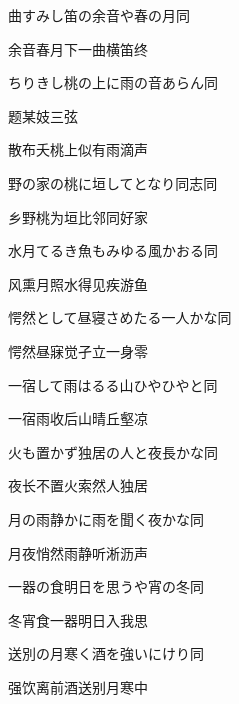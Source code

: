 \begin{haiku}
    {\FH 曲すみし笛の余音や春の月}\hfill{\FH 同}

    {\FK 余音春月下一曲横笛终}
\end{haiku}

\begin{haiku}
    {\FH ちりきし桃の上に雨の音あらん}\hfill{\FH 同}

    {\FK 题某妓三弦}

    {\FK 散布夭桃上似有雨滴声}
\end{haiku}

\begin{haiku}
    {\FH 野の家の桃に垣してとなり同志}\hfill{\FH 同}

    {\FK 乡野桃为垣比邻同好家}
\end{haiku}

\begin{haiku}
    {\FH 水月てるき魚もみゆる風かおる}\hfill{\FH 同}

    {\FK 风熏月照水得见疾游鱼}
\end{haiku}

\begin{haiku}
    {\FH 愕然として昼寝さめたる一人かな}\hfill{\FH 同}

    {\FK 愕然昼寐觉孑立一身零}
\end{haiku}

\begin{haiku}
    {\FH 一宿して雨はるる山ひやひやと}\hfill{\FH 同}

    {\FK 一宿雨收后山晴丘壑凉}
\end{haiku}

\begin{haiku}
    {\FH 火も置かず独居の人と夜長かな}\hfill{\FH 同}

    {\FK 夜长不置火索然人独居}
\end{haiku}

\begin{haiku}
    {\FH 月の雨静かに雨を聞く夜かな}\hfill{\FH 同}

    {\FK 月夜悄然雨静听淅沥声}
\end{haiku}

\begin{haiku}
    {\FH 一器の食明日を思うや宵の冬}\hfill{\FH 同}

    {\FK 冬宵食一器明日入我思}
\end{haiku}

\begin{haiku}
    {\FH 送別の月寒く酒を強いにけり}\hfill{\FH 同}

    {\FK 强饮离前酒送别月寒中}
\end{haiku}

